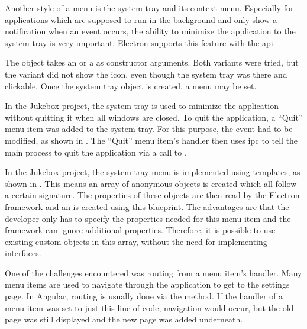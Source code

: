 
Another style of a menu is the system tray and its context menu. Especially for applications which are supposed to run in the background and only show a notification when an event occurs, the ability to minimize the application to the system tray is very important. Electron supports this feature with the  \gls{api}.

The  object takes an  or a  as constructor arguments. Both variants were tried, but the  variant did not show the icon, even though the system tray was there and clickable. Once the system tray object is created, a menu may be set.


In the Jukebox project, the system tray is used to minimize the application without quitting it when all windows are closed. To quit the application, a \enquote{Quit} menu item was added to the system tray. For this purpose, the  event had to be modified, as shown in . The \enquote{Quit} menu item's  handler then uses \gls{ipc} to tell the main process to quit the application via a call to .


In the Jukebox project, the system tray menu is implemented using templates, as shown in . This means an array of anonymous objects is created which all follow a certain signature. The properties of these objects are then read by the Electron framework and an  is created using this blueprint. The advantages are that the developer only has to specify the properties needed for this menu item and the framework can ignore additional properties. Therefore, it is possible to use existing custom objects in this array, without the need for implementing interfaces.


One of the challenges encountered was routing from a menu item's  handler. Many menu items are used to navigate through the application \zB to get to the settings page. In Angular, routing is usually done via the  method. If the  handler of a menu item was set to just this line of code, navigation would occur, but the old page was still displayed and the new page was added underneath.

